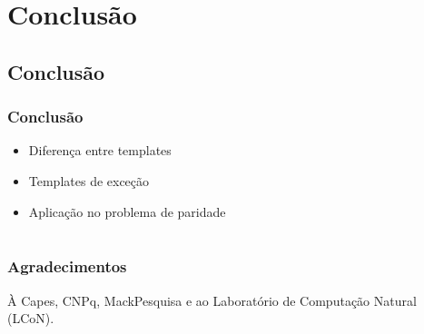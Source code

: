 \documentclass[aspectratio=43,hyperref={pdfpagelabels=false}]{beamer}
\begin{document}
%      

 \section[Conclusão]{Conclusão}
 \subsection*{Conclusão}
\begin{frame}[t]
     \frametitle{Conclusão}
\center
    \begin{itemize}
           \item Diferença entre templates
           \item Templates de exceção
           \item Aplicação no problema de paridade
     \end{itemize}
\end{frame}

\section*{}
\begin{frame}[t]
     \frametitle{Agradecimentos}
\vspace{1cm}
\center
     À Capes, CNPq, MackPesquisa e ao Laboratório de Computação Natural (LCoN).
\end{frame}
\end{document}
